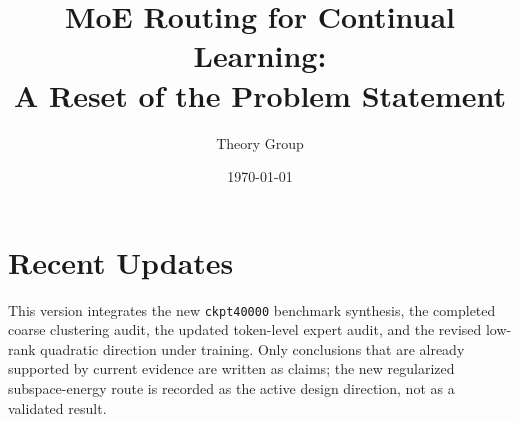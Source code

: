 \documentclass[11pt]{article}
\title{MoE Routing for Continual Learning:\\ A Reset of the Problem Statement}
\author{Theory Group}
\date{\today}
\begin{document}
\maketitle

\section{Recent Updates}

This version integrates the new \texttt{ckpt40000} benchmark synthesis, the completed coarse clustering audit, the updated token-level expert audit, and the revised low-rank quadratic direction under training. Only conclusions that are already supported by current evidence are written as claims; the new regularized subspace-energy route is recorded as the active design direction, not as a validated result.
\end{document}
